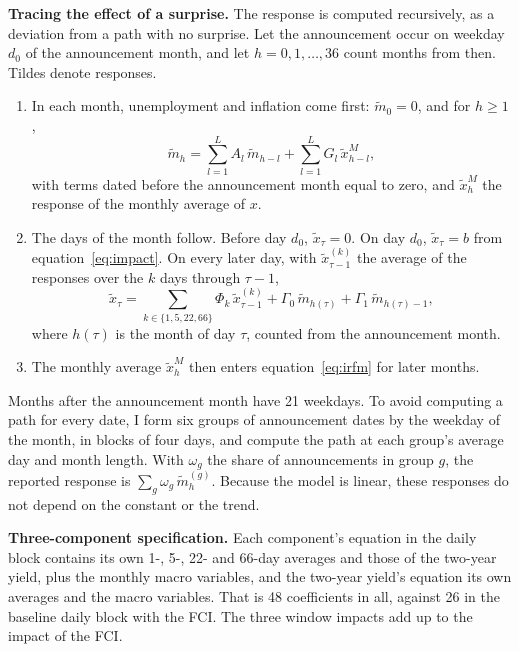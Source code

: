 \documentclass[11pt]{article}
\begin{document}
\begin{appendices}
\textbf{Tracing the effect of a surprise.} The response is computed recursively, as a deviation from a path with no surprise. Let the announcement occur on weekday $d_0$ of the announcement month, and let $h=0,1,\ldots,36$ count months from then. Tildes denote responses.
\begin{enumerate}
\item In each month, unemployment and inflation come first: $\tilde m_0=0$, and for $h\geq 1$,
\begin{equation}
\tilde m_h = \sum_{l=1}^{L} A_l\, \tilde m_{h-l} + \sum_{l=1}^{L} G_l\, \tilde x^{M}_{h-l}, \label{eq:irfm}
\end{equation}
with terms dated before the announcement month equal to zero, and $\tilde x^{M}_{h}$ the response of the monthly average of $x$.
\item The days of the month follow. Before day $d_0$, $\tilde x_\tau=0$. On day $d_0$, $\tilde x_\tau=b$ from equation~\eqref{eq:impact}. On every later day, with $\tilde x^{(k)}_{\tau-1}$ the average of the responses over the $k$ days through $\tau-1$,
\begin{equation}
\tilde x_\tau = \sum_{k\in\{1,5,22,66\}} \Phi_{k}\, \tilde x_{\tau-1}^{(k)} + \Gamma_0\, \tilde m_{h(\tau)} + \Gamma_1\, \tilde m_{h(\tau)-1}, \label{eq:irfd}
\end{equation}
where $h(\tau)$ is the month of day $\tau$, counted from the announcement month.
\item The monthly average $\tilde x^{M}_h$ then enters equation~\eqref{eq:irfm} for later months.
\end{enumerate}
Months after the announcement month have 21 weekdays. To avoid computing a path for every date, I form six groups of announcement dates by the weekday of the month, in blocks of four days, and compute the path at each group's average day and month length. With $\omega_g$ the share of announcements in group $g$, the reported response is $\sum_g \omega_g\, \tilde m_h^{(g)}$. Because the model is linear, these responses do not depend on the constant or the trend.

\textbf{Three-component specification.} Each component's equation in the daily block contains its own 1-, 5-, 22- and 66-day averages and those of the two-year yield, plus the monthly macro variables, and the two-year yield's equation its own averages and the macro variables. That is 48 coefficients in all, against 26 in the baseline daily block with the FCI. The three window impacts add up to the impact of the FCI.


\end{appendices}
\end{document}
